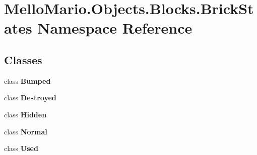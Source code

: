 \section{Mello\+Mario.\+Objects.\+Blocks.\+Brick\+States Namespace Reference}
\label{namespaceMelloMario_1_1Objects_1_1Blocks_1_1BrickStates}
\subsection*{Classes}
\begin{DoxyCompactItemize}
\item 
class \textbf{ Bumped}
\item 
class \textbf{ Destroyed}
\item 
class \textbf{ Hidden}
\item 
class \textbf{ Normal}
\item 
class \textbf{ Used}
\end{DoxyCompactItemize}
